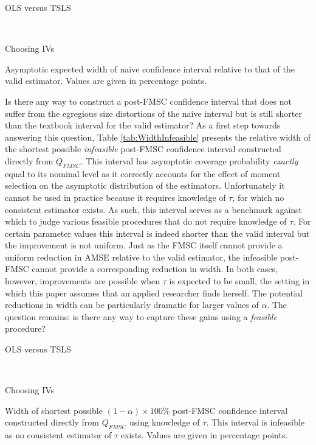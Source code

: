 \begin{table}[h]
  \centering
  \begin{subtable}{0.48\textwidth}
    \caption{OLS versus TSLS}
    
  \end{subtable}
  ~
  \begin{subtable}{0.48\textwidth}
    \caption{Choosing IVs}
    
  \end{subtable}
  \caption{Asymptotic expected width of naive confidence interval relative to that of the valid estimator. Values are given in percentage points.}
  \label{tab:LimitNaiveWidth}
\end{table}

Is there any way to construct a post-FMSC confidence interval that does not suffer from the egregious size distortions of the naive interval but is still shorter than the textbook interval for the valid estimator?
As a first step towards answering this question, Table \ref{tab:WidthInfeasible} presents the relative width of the shortest possible \emph{infeasible} post-FMSC confidence interval constructed directly from $Q_{FMSC}$.
This interval has asymptotic coverage probability \emph{exactly} equal to its nominal level as it correctly accounts for the effect of moment selection on the asymptotic distribution of the estimators.
Unfortunately it cannot be used in practice because it requires knowledge of $\tau$, for which no consistent estimator exists.
As such, this interval serves as a benchmark against which to judge various feasible procedures that do not require knowledge of $\tau$.
For certain parameter values this interval is indeed shorter than the valid interval but the improvement is not uniform.
Just as the FMSC itself cannot provide a uniform reduction in AMSE relative to the valid estimator, the infeasible post-FMSC cannot provide a corresponding reduction in width.
In both cases, however, improvements are possible when $\tau$ is expected to be small, the setting in which this paper assumes that an applied researcher finds herself. 
The potential reductions in width can be particularly dramatic for larger values of $\alpha$.
The question remains: is there any way to capture these gains using a \emph{feasible} procedure?


\begin{table}[h]
  \centering
  \begin{subtable}{0.48\textwidth}
    \caption{OLS versus TSLS}
    
  \end{subtable}
  ~
  \begin{subtable}{0.48\textwidth}
    \caption{Choosing IVs}
    
  \end{subtable}
  \caption{Width of shortest possible $(1-\alpha)\times 100\%$ post-FMSC confidence interval constructed directly from $Q_{FMSC}$ using knowledge of $\tau$. This interval is infeasible as no consistent estimator of $\tau$ exists. Values are given in percentage points.}
  \label{tab:WidthInfeasible}
\end{table}

